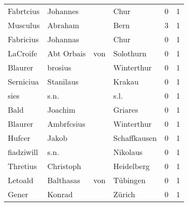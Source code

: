 \begin{tabular}{llllrr}
                Fabrtcius &                           Johannes &             &                                        Chur &          0 &         1 \\
                 Musculus &                            Abraham &             &                                        Bern &          3 &         1 \\
                Fabricius &                           Johannas &             &                                        Chur &          0 &         1 \\
                 LaCroife &                        Abt  Orbais &         von &                                   Solothurn &          0 &         1 \\
                  Blaurer &                            brosius &             &                                  Winterthur &          0 &         1 \\
                Serniciua &                          Stanilaus &             &                                      Krakau &          0 &         1 \\
                     sies &                               s.n. &             &                                        s.l. &          0 &         1 \\
                     Bald &                            Joachim &             &                                     Griares &          0 &         1 \\
                  Blaurer &                         Ambrfcsius &             &                                  Winterthur &          0 &         1 \\
                   Hufcer &                              Jakob &             &                                Schaffkausen &          0 &         1 \\
               fiadziwill &                               s.n. &             &                                    Nikolaus &          0 &         1 \\
                 Thretius &                          Christoph &             &                                  Heidelberg &          0 &         1 \\
                  Letoald &                          Balthasas &         von &                                    Tübingen &          0 &         1 \\
                    Gener &                             Konrad &             &                                      Zürich &          0 &         1 \\

\end{tabular}

